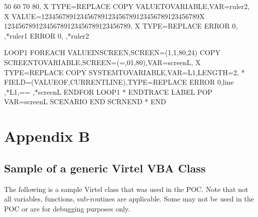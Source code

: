 \documentclass[letterpaper,10pt,english]{sphinxmanual}
\begin{document}
\begin{sphinxVerbatim}[commandchars=\\\{\}]
               \textbar{}\PYGZhy{}\PYGZhy{}\PYGZhy{} 50\PYGZhy{}\PYGZhy{}\PYGZhy{}\textbar{}\PYGZhy{}\PYGZhy{}\PYGZhy{} 60\PYGZhy{}\PYGZhy{}\PYGZhy{}\textbar{}\PYGZhy{}\PYGZhy{}\PYGZhy{} 70\PYGZhy{}\PYGZhy{}\PYGZhy{}\textbar{}\PYGZhy{}\PYGZhy{}\PYGZhy{} 80\PYGZhy{}\PYGZhy{}\PYGZhy{}\textbar{}\PYGZsq{},             X
               TYPE=REPLACE
         COPY\PYGZdl{} VALUE\PYGZhy{}TO\PYGZhy{}VARIABLE,VAR=\PYGZsq{}ruler2\PYGZsq{},                         X
               VALUE=\PYGZsq{}123456789\textbar{}123456789\textbar{}123456789\textbar{}123456789\textbar{}123456789X
               \textbar{}123456789\textbar{}123456789\textbar{}123456789\textbar{}123456789\textbar{}\PYGZsq{},             X
               TYPE=REPLACE
         ERROR\PYGZdl{} 0,\PYGZsq{}          \PYGZsq{},\PYGZsq{}*ruler1\PYGZsq{}
         ERROR\PYGZdl{} 0,\PYGZsq{}          \PYGZsq{},\PYGZsq{}*ruler2\PYGZsq{}

LOOP1    FOREACH\PYGZdl{} VALUE\PYGZhy{}IN\PYGZhy{}SCREEN,SCREEN=(1,1,80,24)
         COPY\PYGZdl{} SCREEN\PYGZhy{}TO\PYGZhy{}VARIABLE,SCREEN=(=,01,80),VAR=\PYGZsq{}screenL\PYGZsq{},      X
               TYPE=REPLACE
         COPY\PYGZdl{} SYSTEM\PYGZhy{}TO\PYGZhy{}VARIABLE,VAR=\PYGZsq{}L1\PYGZsq{},LENGTH=2,                   *
               FIELD=(VALUE\PYGZhy{}OF,CURRENT\PYGZhy{}LINE),TYPE=REPLACE
         ERROR\PYGZdl{} 0,\PYGZsq{}line \PYGZsq{},\PYGZsq{}*L1\PYGZsq{},\PYGZsq{}== \PYGZsq{},\PYGZsq{}*screenL\PYGZsq{}
         ENDFOR\PYGZdl{} LOOP1
*
ENDTRACE LABEL\PYGZdl{}
         POP\PYGZdl{} VAR=\PYGZsq{}screenL\PYGZsq{}
         SCENARIO END
         SCRNEND
*
         END
\end{sphinxVerbatim}


\chapter{Appendix B}
\label{\detokenize{TN202001:appendix-b}}

\section{Sample of a generic Virtel VBA Class}
\label{\detokenize{TN202001:sample-of-a-generic-virtel-vba-class}}
The following is a sample Virtel class that was used in the POC. Note that not all variables, functions, sub-routines are applicable. Some may not be used in the POC or are for debugging purposes only.
\end{document}

